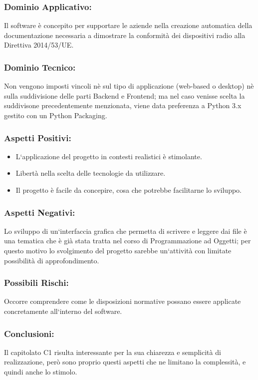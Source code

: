 \documentclass[a4paper,12pt]{article}
\begin{document}
\subsubsection*{Dominio Applicativo:} Il software è concepito per supportare le aziende nella creazione automatica della documentazione necessaria a dimostrare la conformità dei dispositivi radio alla Direttiva 2014/53/UE.
\subsubsection*{Dominio Tecnico:} Non vengono imposti vincoli nè sul tipo di applicazione (web-based o desktop) nè sulla suddivisione delle parti Backend e Frontend; ma nel caso venisse scelta la suddivisone precedentemente menzionata, viene data preferenza a Python 3.x gestito con un Python Packaging.
\subsubsection*{Aspetti Positivi:}
\begin{itemize}
    \item L`applicazione del progetto in contesti realistici è stimolante.
    \item Libertà nella scelta delle tecnologie da utilizzare.
    \item Il progetto è facile da concepire, cosa che potrebbe facilitarne lo sviluppo.
\end{itemize}

\subsubsection*{Aspetti Negativi:}
Lo sviluppo di un`interfaccia grafica che permetta di scrivere e leggere dai file è una tematica che è già stata tratta nel corso di Programmazione ad Oggetti; per questo motivo lo svolgimento del progetto sarebbe un`attività con limitate possibilità di approfondimento.

\subsubsection*{Possibili Rischi:}
Occorre comprendere come le disposizioni normative possano essere applicate concretamente all`interno del software.

\subsubsection*{Conclusioni:}
Il capitolato C1 risulta interessante per la sua chiarezza e semplicità di realizzazione, però sono proprio questi aspetti che ne limitano la complessità, e quindi anche lo stimolo.
\end{document}
